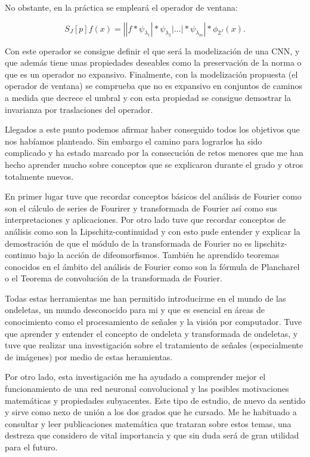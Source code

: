 \medskip

\noindent No obstante, en la práctica se empleará el operador de ventana:

\begin{equation}
  S_J[p]f(x)=\left| |f \ast \psi_{\lambda_1} | \ast \psi_{\lambda_2} | \ldots | \ast \psi_{\lambda_m} \right| \ast \phi_{2^J}(x).
\end{equation}

\noindent Con este operador se consigue definir el que será la modelización de una CNN, y que además tiene unas propiedades deseables como la preservación de la norma o que es un operador no expansivo. Finalmente, con la modelización propuesta (el operador de ventana) se comprueba que no es expansivo en conjuntos de caminos a medida que decrece el umbral y con esta propiedad se consigue demostrar la invarianza por traslaciones del operador.

\medskip

\noindent Llegados a este punto podemos afirmar haber conseguido todos los objetivos que nos habíamos planteado. Sin embargo el camino para lograrlos ha sido complicado y ha estado marcado por la consecución de retos menores que me han hecho aprender mucho sobre conceptos que se explicaron durante el grado y otros totalmente nuevos.

\medskip

\noindent En primer lugar tuve que recordar conceptos básicos del análisis de Fourier como son el cálculo de series de Fourirer y transformada de Fourier así como sus interpretaciones y aplicaciones. Por otro lado tuve que recordar conceptos de análisis como son la Lipschitz-continuidad y con esto pude entender y explicar la demostración de que el módulo de la transformada de Fourier no es lipschitz-continuo bajo la acción de difeomorfismos. También he aprendido teoremas conocidos en el ámbito del análisis de Fourier como son la fórmula de Plancharel o el Teorema de convolución de la transformada de Fourier. 

\medskip

\noindent Todas estas herramientas me han permitido introducirme en el mundo de las ondeletas, un mundo desconocido para mi y que es esencial en áreas de conocimiento como el procesamiento de señales y la visión por computador. Tuve que aprender y entender el concepto de ondeleta y transformada de ondeletas, y tuve que realizar una investigación sobre el tratamiento de señales (especialmente de imágenes) por medio de estas heramientas.

\medskip

\noindent Por otro lado, esta investigación me ha ayudado a comprender mejor el funcionamiento de una red neuronal convolucional y las posibles motivaciones matemáticas y propiedades subyacentes. Este tipo de estudio, de nuevo da sentido y sirve como nexo de unión a los dos grados que he cursado. Me he habituado a consultar y leer publicaciones matemática que trataran sobre estos temas, una destreza que considero de vital importancia y que sin duda será de gran utilidad para el futuro.

\endinput